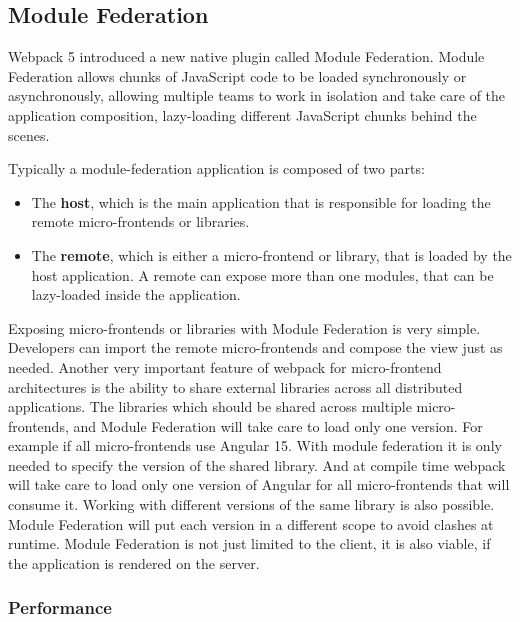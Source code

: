 \subsection{Module Federation}

Webpack 5 introduced a new native plugin called Module Federation. Module Federation allows chunks of JavaScript code to be loaded synchronously or asynchronously, allowing multiple teams to work in isolation and take care of the application composition, lazy-loading different JavaScript chunks behind the scenes. \cite[81]{book:2021:mezzalira:applied-methods:building-micro-frontends}

\bigskip

\noindent Typically a module-federation application is composed of two parts: \cite[81]{book:2021:mezzalira:applied-methods:building-micro-frontends}

\begin{itemize}
    \item The \textbf{host}, which is the main application that is responsible for loading the remote micro-frontends or libraries.
    \item The \textbf{remote}, which is either a micro-frontend or library, that is loaded by the host application. A remote can expose more than one modules, that can be lazy-loaded inside the application.
\end{itemize}

\noindent Exposing micro-frontends or libraries with Module Federation is very simple. Developers can import the remote micro-frontends and compose the view just as needed. Another very important feature of webpack for micro-frontend architectures is the ability to share external libraries across all distributed applications. The libraries which should be shared across multiple micro-frontends, and Module Federation will take care to load only one version. For example if all micro-frontends use Angular 15. With module federation it is only needed to specify the version of the shared library. And at compile time webpack will take care to load only one version of Angular for all micro-frontends that will consume it. Working with different versions of the same library is also possible. Module Federation will put each version in a different scope to avoid clashes at runtime. Module Federation is not just limited to the client, it is also viable, if the application is rendered on the server. \cite[82-83]{book:2021:mezzalira:applied-methods:building-micro-frontends}

\subsubsection{Performance}

